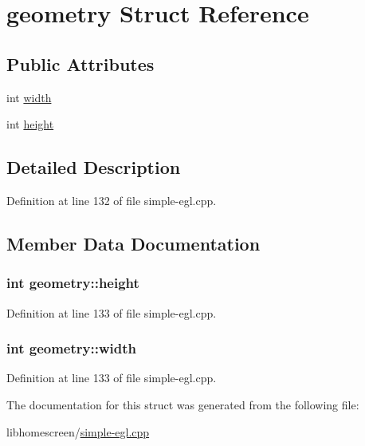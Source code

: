\hypertarget{structgeometry}{}\section{geometry Struct Reference}
\label{structgeometry}
\subsection*{Public Attributes}
\begin{DoxyCompactItemize}
\item 
int \hyperlink{structgeometry_a854a87ce277335591f06958a2363c3e1}{width}
\item 
int \hyperlink{structgeometry_a6968ae18c72699d1c164399bf0e5cf14}{height}
\end{DoxyCompactItemize}


\subsection{Detailed Description}


Definition at line 132 of file simple-\/egl.\+cpp.



\subsection{Member Data Documentation}
\subsubsection[{\texorpdfstring{height}{height}}]{\setlength{\rightskip}{0pt plus 5cm}int geometry\+::height}\hypertarget{structgeometry_a6968ae18c72699d1c164399bf0e5cf14}{}\label{structgeometry_a6968ae18c72699d1c164399bf0e5cf14}


Definition at line 133 of file simple-\/egl.\+cpp.

\subsubsection[{\texorpdfstring{width}{width}}]{\setlength{\rightskip}{0pt plus 5cm}int geometry\+::width}\hypertarget{structgeometry_a854a87ce277335591f06958a2363c3e1}{}\label{structgeometry_a854a87ce277335591f06958a2363c3e1}


Definition at line 133 of file simple-\/egl.\+cpp.



The documentation for this struct was generated from the following file\+:\begin{DoxyCompactItemize}
\item 
libhomescreen/\hyperlink{simple-egl_8cpp}{simple-\/egl.\+cpp}\end{DoxyCompactItemize}
